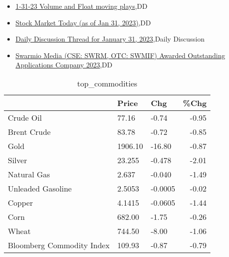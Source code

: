 \documentclass{article}%
\begin{document}
%
\begin{itemize}%
\item%
\href{https://reddit.com/r/wallstreetbets/comments/10py4an/13123\_volume\_and\_float\_moving\_plays/}{1-31-23 Volume and Float moving plays},DD%
\item%
\href{https://reddit.com/r/wallstreetbets/comments/10pxxcb/stock\_market\_today\_as\_of\_jan\_31\_2023/}{Stock Market Today (as of Jan 31, 2023)},DD%
\item%
\href{https://reddit.com/r/wallstreetbets/comments/10pw79e/daily\_discussion\_thread\_for\_january\_31\_2023/}{Daily Discussion Thread for January 31, 2023},Daily Discussion%
\item%
\href{https://reddit.com/r/Baystreetbets/comments/10p2b7f/swarmio\_media\_cse\_swrm\_otc\_swmif\_awarded/}{Swarmio Media (CSE: SWRM, OTC: SWMIF) Awarded Outstanding Applications Company 2023},DD%
\end{itemize}%


\begin{table}[htbp]%
\caption{top\_commodities}%
\centering%
\begin{adjustbox}{width=1\textwidth}%
\begin{tabular}{lllr}
\toprule
                          &   Price &     Chg &  \%Chg \\
\midrule
               Crude Oil  &   77.16 &   -0.74 & -0.95 \\
             Brent Crude  &   83.78 &   -0.72 & -0.85 \\
                    Gold  & 1906.10 &  -16.80 & -0.87 \\
                  Silver  &  23.255 &  -0.478 & -2.01 \\
             Natural Gas  &   2.637 &  -0.040 & -1.49 \\
       Unleaded Gasoline  &  2.5053 & -0.0005 & -0.02 \\
                  Copper  &  4.1415 & -0.0605 & -1.44 \\
                    Corn  &  682.00 &   -1.75 & -0.26 \\
                   Wheat  &  744.50 &   -8.00 & -1.06 \\
Bloomberg Commodity Index &  109.93 &   -0.87 & -0.79 \\
\bottomrule
\end{tabular}
%
\end{adjustbox}%
\end{table}

%
\end{document}

